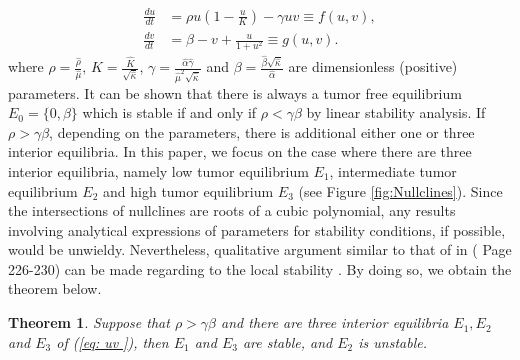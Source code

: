 \documentclass{aims}
\newtheorem{theorem}{Theorem}[section]
\theoremstyle{definition}
\begin{document}
\begin{subequations}\label{eq: uv }
\begin{align}
\frac{du}{dt} & =\rho u(1-\frac{u}{K})-\gamma uv\equiv f(u,v),\\
\frac{dv}{dt} & =\beta-v+\frac{u}{1+u^{2}}\equiv g(u,v).
\end{align}
\end{subequations} where $\rho=\frac{\hat{\rho}}{\hat{\mu}},\,K=\frac{\hat{K}}{\sqrt{\hat{\kappa}}},\,\gamma=\frac{\hat{\alpha}\hat{\gamma}}{\hat{\mu}^{2}\sqrt{\hat{\kappa}}}$ and $\beta=\frac{\hat{\beta}\sqrt{\hat{\kappa}}}{\hat{\alpha}}$ are dimensionless (positive) parameters.
It can be shown that there is always a tumor free equilibrium $E_{0}=\{0,\beta\}$
which is stable if and only if $\rho<\gamma\beta$ by linear stability analysis.
If $\rho>\gamma \beta$, depending on the parameters, there is additional either one or three interior
equilibria. In this paper, we focus on the case where there are
three interior equilibria, namely low tumor equilibrium $E_{1}$, intermediate tumor equilibrium $E_{2}$ and high tumor equilibrium $E_{3}$
(see Figure \ref{fig:Nullclines}). Since the intersections of nullclines
are roots of a cubic polynomial, any results involving analytical
expressions of parameters for stability conditions, if possible, would
be unwieldy. Nevertheless, qualitative argument similar to that of in (\cite{murraymathematical} Page 226-230) can be made regarding to the local stability .
By doing so, we obtain the theorem below.
\begin{theorem} \label{thm:ODE local stability}
Suppose that $\rho>\gamma\beta$ and there are three interior equilibria $E_1,E_2$ and $E_3$ of (\ref{eq: uv }), then $E_1$ and $E_3$ are stable, and $E_2$ is unstable.   
\end{theorem}
\end{document}

